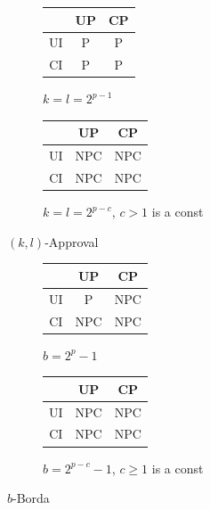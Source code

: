 {
	\begin{figure}
		\centering
    \begin{subfigure}[b]{0.45\textwidth}
			\centering
		  \begin{tabular}[0.45\textwidth]{ | c | c | c | }
		    \hline
		      & UP & CP \\
		    \hline
		    UI & P & P \\
		    \hline
		    CI & P & P \\
		    \hline
		  \end{tabular}
			\caption{$k=l=2^{p-1}$}
		\end{subfigure}
    \begin{subfigure}[b]{0.45\textwidth}
			\centering
		  \begin{tabular}[0.45\textwidth]{ | c | c | c | }
		    \hline
		      & UP & CP \\
		    \hline
		    UI & NPC & NPC \\
		    \hline
		    CI & NPC & NPC \\
		    \hline
		  \end{tabular}
			\caption{\footnotesize $k=l=2^{p-c}$, $c>1$ is a const}
		\end{subfigure}
		\caption{$(k,l)$-Approval}
	\end{figure}
}

{
	\begin{figure}
		\centering
    \begin{subfigure}[b]{0.45\textwidth}
			\centering
		  \begin{tabular}[0.45\textwidth]{ | c | c | c | }
		    \hline
		      & UP & CP \\
		    \hline
		    UI & P & NPC \\
		    \hline
		    CI & NPC & NPC \\
		    \hline
		  \end{tabular}
			\caption{$b = 2^p-1$}
		\end{subfigure}
    \begin{subfigure}[b]{0.45\textwidth}
			\centering
		  \begin{tabular}[0.45\textwidth]{ | c | c | c | }
		    \hline
		      & UP & CP \\
		    \hline
		    UI & NPC & NPC \\
		    \hline
		    CI & NPC & NPC \\
		    \hline
		  \end{tabular}
			\caption{\footnotesize $b = 2^{p-c}-1$, $c\geq 1$ is a const}
		\end{subfigure}
		\caption{$b$-Borda}
	\end{figure}
}

